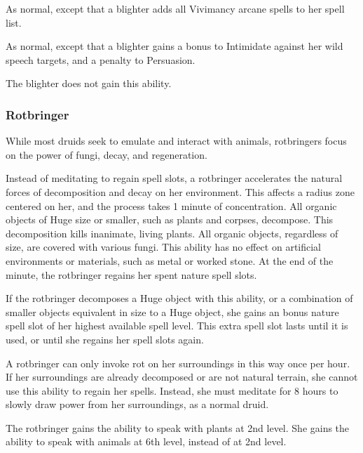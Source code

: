              As normal, except that a blighter adds all Vivimancy arcane spells to her spell list.

             As normal, except that a blighter gains a  bonus to Intimidate against her wild speech targets, and a  penalty to Persuasion.

             The blighter does not gain this ability.



        \subsubsection{Rotbringer}

            While most druids seek to emulate and interact with animals, rotbringers focus on the power of fungi, decay, and regeneration.

             Instead of meditating to regain spell slots, a rotbringer accelerates the natural forces of decomposition and decay on her environment.
            This affects a \areahuge radius zone centered on her, and the process takes 1 minute of concentration.
            All organic objects of Huge size or smaller, such as plants and corpses, decompose.
            This decomposition kills inanimate, living plants.
            All organic objects, regardless of size, are covered with various fungi.
            This ability has no effect on artificial environments or materials, such as metal or worked stone.
            At the end of the minute, the rotbringer regains her spent nature spell slots.

            If the rotbringer decomposes a Huge object with this ability, or a combination of smaller objects equivalent in size to a Huge object, she gains an bonus nature spell slot of her highest available spell level.
            This extra spell slot lasts until it is used, or until she regains her spell slots again.

            A rotbringer can only invoke rot on her surroundings in this way once per hour.
            If her surroundings are already decomposed or are not natural terrain, she cannot use this ability to regain her spells.
            Instead, she must meditate for 8 hours to slowly draw power from her surroundings, as a normal druid.

             The rotbringer gains the ability to speak with plants at 2nd level.
            She gains the ability to speak with animals at 6th level, instead of at 2nd level.

